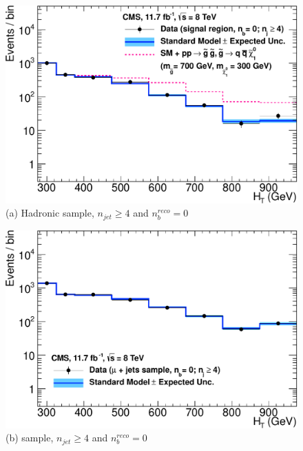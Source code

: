 \begin{figure}[ht]
\footnotesize
\centering
\begin{minipage}[b]{0.48 \linewidth}
\includegraphics[width = 1.0\linewidth]{plots/hadronic_0b_ge4j_logy.pdf}
\centering (a)  Hadronic sample, $n_{jet} \geq 4$ and $n_{b}^{reco} = 0$ 
\end{minipage}
\quad
\begin{minipage}[b]{0.48\linewidth}
\includegraphics[width = 1.0\linewidth]{plots/muon_0b_ge4j_logy.pdf}
\centering (b)  \mupjets sample, $n_{jet} \geq 4$ and $n_{b}^{reco} = 0$  
\end{minipage} \\
\vspace{0.4cm}
\begin{minipage}[b]{0.48 \linewidth}

\end{minipage}
\end{figure}
